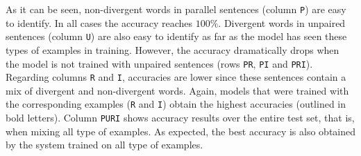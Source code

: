 \documentclass[11pt,a4paper]{article}
\begin{document}
As it can be seen, non-divergent words in parallel sentences (column \texttt{P}) are easy to identify. 
In all cases the accuracy reaches $100\%$. 
Divergent words in unpaired sentences (column \texttt{U}) are also easy to identify as far as the model has seen these types of examples in training. 
However, the accuracy dramatically drops when the model is not trained with unpaired sentences (rows  \texttt{PR}, \texttt{PI} and \texttt{PRI}).
Regarding columns \texttt{R} and \texttt{I}, accuracies are lower since these sentences contain a mix of divergent and non-divergent words. 
Again, models that were trained with the corresponding examples (\texttt{R} and \texttt{I}) obtain the highest accuracies (outlined in bold letters).
Column \texttt{PURI} shows accuracy results over the entire test set,
that is, when mixing all type of examples. As expected, the best
accuracy is also obtained by the system trained on all type of  examples. 

\end{document}
